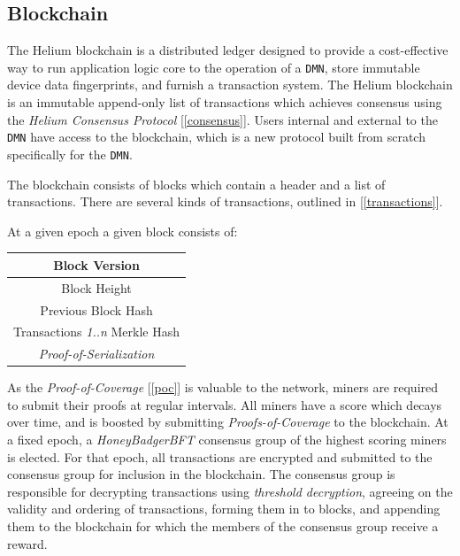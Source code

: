 \documentclass[10pt, nonatbib, nocopyrightspace, reprint]{sigplanconf}
\newcommand{\secref}[1]{[\autoref{#1}]}
\begin{document}
\subsection{Blockchain} \label{blockchain}

The Helium blockchain is a distributed ledger designed to provide a cost-effective way to run application logic core to the operation of a \verb|DMN|, store immutable device data fingerprints, and furnish a transaction system. The Helium blockchain is an immutable append-only list of transactions which achieves consensus using the \emph{Helium Consensus Protocol} \secref{consensus}. Users internal and external to the \verb|DMN| have access to the blockchain, which is a new protocol built from scratch specifically for the \verb|DMN|.

The blockchain consists of blocks which contain a header and a list of transactions. There are several kinds of transactions, outlined in \secref{transactions}.

At a given epoch a given block consists of:

\begin{center}
    \begin{tabular}{|c|}
         \hline
         Block Version \\
         \hline
         Block Height \\
         \hline
         Previous Block Hash \\
         \hline
         Transactions \emph{1..n} Merkle Hash \\
         \hline
         \emph{Proof-of-Serialization} \\
         \hline
    \end{tabular}
\end{center}

As the \emph{Proof-of-Coverage} \secref{poc} is valuable to the network, miners are required to submit their proofs at regular intervals. All miners have a score which decays over time, and is boosted by submitting \emph{Proofs-of-Coverage} to the blockchain. At a fixed epoch, a \emph{HoneyBadgerBFT} \cite{honeybadger} consensus group of the highest scoring miners is elected. For that epoch, all transactions are encrypted and submitted to the consensus group for inclusion in the blockchain. The consensus group is responsible for decrypting transactions using \emph{threshold decryption}, agreeing on the validity and ordering of transactions, forming them in to blocks, and appending them to the blockchain for which the members of the consensus group receive a reward.
\end{document}
